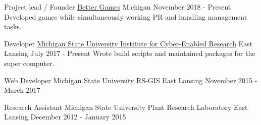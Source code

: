 
\begin{cventries}
  \cventry
    {Project lead / Founder} %
    {\href{https://www.better-games.org}{Better Games}} %
    {Michigan} %
    {November 2018 - Present} %
    {
        {Developed games while simultaneously working PR and handling management tasks.}
    }

  \cventry
    {Developer}
    {\href{https://icer.msu.edu/}{Michigan State University Institute for Cyber-Enabled Research}}
    {East Lansing}
    {July 2017 - Present}
    {
        {Wrote build scripts and maintained packages for the super computer.}
    }

  \cventry
    {Web Developer}
    {Michigan State University RS-GIS}
    {East Lansing}
    {November 2015 - March 2017}
    {
    }

  \cventry
    {Research Assistant}
    {Michigan State University Plant Research Laboratory}
    {East Lansing}
    {December 2012 - January 2015}
    {
    }
\end{cventries}
